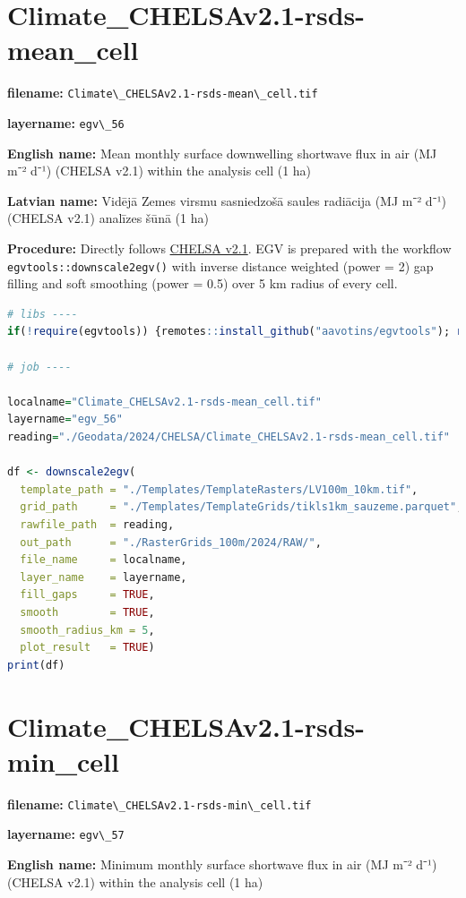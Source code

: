\documentclass[
]{book}
\newcommand{\passthrough}[1]{#1}
\begin{document}
\section{Climate\_CHELSAv2.1-rsds-mean\_cell}\label{ch06.056}

\textbf{filename:} \passthrough{\lstinline!Climate\_CHELSAv2.1-rsds-mean\_cell.tif!}

\textbf{layername:} \passthrough{\lstinline!egv\_56!}

\textbf{English name:} Mean monthly surface downwelling shortwave flux in air (MJ m⁻² d⁻¹) (CHELSA v2.1) within the analysis cell (1 ha)

\textbf{Latvian name:} Vidējā Zemes virsmu sasniedzošā saules radiācija (MJ m⁻² d⁻¹) (CHELSA v2.1) analīzes šūnā (1 ha)

\textbf{Procedure:} Directly follows \hyperref[Ch04.11]{CHELSA v2.1}. EGV is prepared with the
workflow \passthrough{\lstinline!egvtools::downscale2egv()!} with inverse distance weighted (power = 2)
gap filling and soft smoothing (power = 0.5) over 5 km radius of every cell.

\begin{lstlisting}[language=R]
# libs ----
if(!require(egvtools)) {remotes::install_github("aavotins/egvtools"); require(egvtools)}

# job ----

localname="Climate_CHELSAv2.1-rsds-mean_cell.tif"
layername="egv_56"
reading="./Geodata/2024/CHELSA/Climate_CHELSAv2.1-rsds-mean_cell.tif"

df <- downscale2egv(
  template_path = "./Templates/TemplateRasters/LV100m_10km.tif",
  grid_path     = "./Templates/TemplateGrids/tikls1km_sauzeme.parquet",
  rawfile_path  = reading,
  out_path      = "./RasterGrids_100m/2024/RAW/",
  file_name     = localname,
  layer_name    = layername,
  fill_gaps     = TRUE,
  smooth        = TRUE,
  smooth_radius_km = 5,
  plot_result   = TRUE)
print(df)
\end{lstlisting}

\section{Climate\_CHELSAv2.1-rsds-min\_cell}\label{ch06.057}

\textbf{filename:} \passthrough{\lstinline!Climate\_CHELSAv2.1-rsds-min\_cell.tif!}

\textbf{layername:} \passthrough{\lstinline!egv\_57!}

\textbf{English name:} Minimum monthly surface shortwave flux in air (MJ m⁻² d⁻¹) (CHELSA v2.1) within the analysis cell (1 ha)
\end{document}
